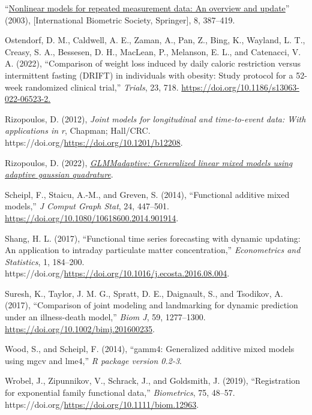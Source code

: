 \documentclass[
  11pt,
]{article}
\newlength{\cslhangindent}
\newlength{\cslentryspacingunit} %
\newenvironment{CSLReferences}[2] %
 {%
  \setlength{\parindent}{0pt}
  \ifodd #1
  \let\oldpar\par
  \def\par{\hangindent=\cslhangindent\oldpar}
  \fi
  \setlength{\parskip}{#2\cslentryspacingunit}
 }%
 {}
\begin{document}
\begin{CSLReferences}{1}{0}
\leavevmode{}%
{``\href{http://www.jstor.org/stable/1400665}{Nonlinear models for
repeated measurement data: An overview and update}''} (2003),
{[}International Biometric Society, Springer{]}, 8, 387--419.

\leavevmode{}%
Ostendorf, D. M., Caldwell, A. E., Zaman, A., Pan, Z., Bing, K.,
Wayland, L. T., Creasy, S. A., Bessesen, D. H., MacLean, P., Melanson,
E. L., and Catenacci, V. A. (2022), {``Comparison of weight loss induced
by daily caloric restriction versus intermittent fasting (DRIFT) in
individuals with obesity: Study protocol for a 52-week randomized
clinical trial,''} \emph{Trials}, 23, 718.
\url{https://doi.org/10.1186/s13063-022-06523-2.}

\leavevmode{}%
Rizopoulos, D. (2012), \emph{Joint models for longitudinal and
time-to-event data: With applications in r}, Chapman; Hall/CRC.
https://doi.org/\url{https://doi.org/10.1201/b12208}.

\leavevmode{}%
Rizopoulos, D. (2022),
\emph{\href{https://CRAN.R-project.org/package=GLMMadaptive}{GLMMadaptive:
Generalized linear mixed models using adaptive gaussian quadrature}}.

\leavevmode{}%
Scheipl, F., Staicu, A.-M., and Greven, S. (2014), {``Functional
additive mixed models,''} \emph{J Comput Graph Stat}, 24, 447--501.
\url{https://doi.org/10.1080/10618600.2014.901914}.

\leavevmode{}%
Shang, H. L. (2017), {``Functional time series forecasting with dynamic
updating: An application to intraday particulate matter
concentration,''} \emph{Econometrics and Statistics}, 1, 184--200.
https://doi.org/\url{https://doi.org/10.1016/j.ecosta.2016.08.004}.

\leavevmode{}%
Suresh, K., Taylor, J. M. G., Spratt, D. E., Daignault, S., and
Tsodikov, A. (2017), {``Comparison of joint modeling and landmarking for
dynamic prediction under an illness-death model,''} \emph{Biom J}, 59,
1277--1300. \url{https://doi.org/10.1002/bimj.201600235}.

\leavevmode{}%
Wood, S., and Scheipl, F. (2014), {``gamm4: Generalized additive mixed
models using mgcv and lme4,''} \emph{R package version 0.2-3}.

\leavevmode{}%
Wrobel, J., Zipunnikov, V., Schrack, J., and Goldsmith, J. (2019),
{``Registration for exponential family functional data,''}
\emph{Biometrics}, 75, 48--57.
https://doi.org/\url{https://doi.org/10.1111/biom.12963}.

\end{CSLReferences}
\end{document}
